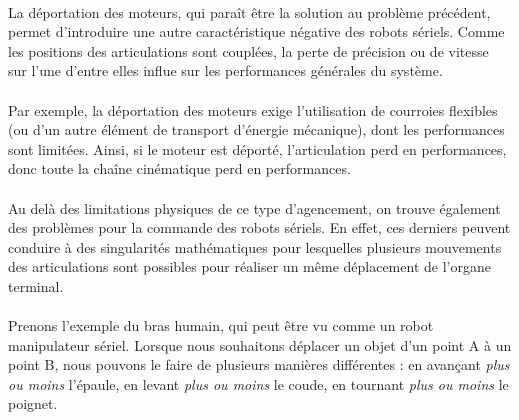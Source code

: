 \documentclass[a4paper,10pt]{article}
\begin{document}
                \paragraph{}
                    La déportation des moteurs, qui paraît être la solution au problème précédent, 
                    permet d'introduire une autre caractéristique négative des robots sériels. 
                    Comme les positions des articulations sont couplées, la perte de précision ou de 
                    vitesse sur l'une d'entre elles influe sur les performances générales du système. 
                    
                \paragraph{}
                    Par exemple, la déportation des moteurs exige l'utilisation de courroies flexibles 
                    (ou d'un autre élément de transport d'énergie mécanique), dont les performances 
                    sont limitées. Ainsi, si le moteur est déporté, l'articulation perd en performances, 
                     donc toute la chaîne cinématique perd en performances. 
                     
                     
                \paragraph{}
                    Au delà des limitations physiques de ce type d'agencement, on trouve également des 
                    problèmes pour la commande des robots sériels. En effet, ces derniers peuvent conduire à des 
                    singularités mathématiques pour lesquelles plusieurs mouvements des articulations 
                    sont possibles pour réaliser un même déplacement de l'organe terminal. 
                    
                \paragraph{}
                    Prenons l'exemple du bras humain, qui peut être vu comme un robot manipulateur 
                    sériel. Lorsque nous souhaitons déplacer un objet d'un point A à un point B, 
                    nous pouvons le faire de plusieurs manières différentes : en avançant \textit{plus ou 
                    moins} l'épaule, en levant \textit{plus ou moins} le coude, en tournant \textit{plus 
                    ou moins} le poignet. 
                    
\end{document}
